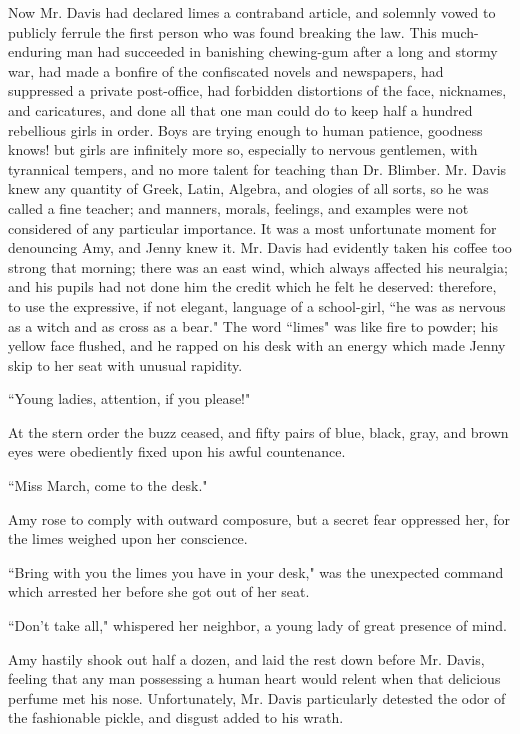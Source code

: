 Now Mr. Davis had declared limes a contraband article, and solemnly
vowed to publicly ferrule the first person who was found breaking the
law. This much-enduring man had succeeded in banishing chewing-gum after
a long and stormy war, had made a bonfire of the confiscated novels and
newspapers, had suppressed a private post-office, had forbidden
distortions of the face, nicknames, and caricatures, and done all that
one man could do to keep half a hundred rebellious girls in order. Boys
are trying enough to human patience, goodness knows! but girls are
infinitely more so, especially to nervous gentlemen, with tyrannical
tempers, and no more talent for teaching than Dr. Blimber. Mr. Davis
knew any quantity of Greek, Latin, Algebra, and ologies of all sorts, so
he was called a fine teacher; and manners, morals, feelings, and
examples were not considered of any particular importance. It was a most
unfortunate moment for denouncing Amy, and Jenny knew it. Mr. Davis had
evidently taken his coffee too strong that morning; there was an east
wind, which always affected his neuralgia; and his pupils had not done
him the credit which he felt he deserved: therefore, to use the
expressive, if not elegant, language of a school-girl, ``he was as
nervous as a witch and as cross as a bear." The word ``limes" was like
fire to powder; his yellow face flushed, and he rapped on his desk with
an energy which made Jenny skip to her seat with unusual rapidity.

``Young ladies, attention, if you please!"

At the stern order the buzz ceased, and fifty pairs of blue, black,
gray, and brown eyes were obediently fixed upon his awful countenance.

``Miss March, come to the desk."

Amy rose to comply with outward composure, but a secret fear oppressed
her, for the limes weighed upon her conscience.

``Bring with you the limes you have in your desk," was the unexpected
command which arrested her before she got out of her seat.

``Don't take all," whispered her neighbor, a young lady
of great presence of mind.

Amy hastily shook out half a dozen, and laid the rest down before Mr.
Davis, feeling that any man possessing a human heart would relent when
that delicious perfume met his nose. Unfortunately, Mr. Davis
particularly detested the odor of the fashionable pickle, and disgust
added to his wrath.

